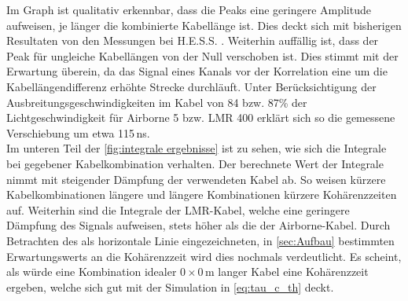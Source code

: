 Im Graph ist qualitativ erkennbar, dass die Peaks eine geringere Amplitude aufweisen, je länger die kombinierte Kabellänge ist. 
Dies deckt sich mit bisherigen Resultaten von den Messungen bei H.E.S.S. \cite{zmijaFirstIntensityInterferometry2023}. 
Weiterhin auffällig ist, dass der Peak für ungleiche Kabellängen von der Null verschoben ist. 
Dies stimmt mit der Erwartung überein, da das Signal eines Kanals vor der Korrelation eine um die Kabellängendifferenz erhöhte Strecke durchläuft. 
Unter Berücksichtigung der Ausbreitungsgeschwindigkeiten im Kabel von 84 bzw. 87\% der Lichtgeschwindigkeit für Airborne 5 bzw. LMR 400 \cite{s.r.lAirborne10Coaxial,LMR400CoaxCable} erklärt sich so die gemessene Verschiebung um etwa 115\,ns. \\
Im unteren Teil der \autoref{fig:integrale ergebnisse} ist zu sehen, wie sich die Integrale bei gegebener Kabelkombination verhalten. 
Der berechnete Wert der Integrale nimmt mit steigender Dämpfung der verwendeten Kabel ab. 
So weisen kürzere Kabelkombinationen längere und längere Kombinationen kürzere Kohärenzzeiten auf. 
Weiterhin sind die Integrale der LMR-Kabel, welche eine geringere Dämpfung des Signals aufweisen, stets höher als die der Airborne-Kabel. 
Durch Betrachten des als horizontale Linie eingezeichneten, in \autoref{sec:Aufbau} bestimmten Erwartungswerts an die Kohärenzzeit wird dies nochmals verdeutlicht. 
Es scheint, als würde eine Kombination idealer $0\times 0\,\mathrm{m}$ langer Kabel eine Kohärenzzeit ergeben, welche sich gut mit der Simulation in \autoref{eq:tau_c_th} deckt. \\

